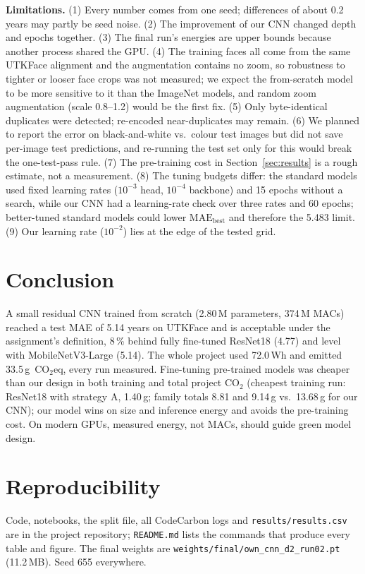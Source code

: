 \documentclass[conference,a4paper]{IEEEtran}
\newcommand{\cotwo}{CO$_2$}
\newcommand{\cotwoeq}{CO$_2$eq}
\begin{document}
\textbf{Limitations.} (1) Every number comes from one seed; differences of about 0.2 years may partly be seed noise. (2) The improvement of our CNN changed depth and epochs together. (3) The final run's energies are upper bounds because another process shared the GPU. (4) The training faces all come from the same UTKFace alignment and the augmentation contains no zoom, so robustness to tighter or looser face crops was not measured; we expect the from-scratch model to be more sensitive to it than the ImageNet models, and random zoom augmentation (scale 0.8--1.2) would be the first fix. (5) Only byte-identical duplicates were detected; re-encoded near-duplicates may remain. (6) We planned to report the error on black-and-white vs.\ colour test images but did not save per-image test predictions, and re-running the test set only for this would break the one-test-pass rule. (7) The pre-training cost in Section~\ref{sec:results} is a rough estimate, not a measurement. (8) The tuning budgets differ: the standard models used fixed learning rates ($10^{-3}$ head, $10^{-4}$ backbone) and 15 epochs without a search, while our CNN had a learning-rate check over three rates and 60 epochs; better-tuned standard models could lower $\mathrm{MAE}_{\text{best}}$ and therefore the 5.483 limit. (9) Our learning rate ($10^{-2}$) lies at the edge of the tested grid.

\section{Conclusion}
A small residual CNN trained from scratch (2.80\,M parameters, 374\,M MACs) reached a test MAE of 5.14 years on UTKFace and is acceptable under the assignment's definition, 8\,\% behind fully fine-tuned ResNet18 (4.77) and level with MobileNetV3-Large (5.14). The whole project used 72.0\,Wh and emitted 33.5\,g~\cotwoeq, every run measured. Fine-tuning pre-trained models was cheaper than our design in both training and total project \cotwo{} (cheapest training run: ResNet18 with strategy A, 1.40\,g; family totals 8.81 and 9.14\,g vs.\ 13.68\,g for our CNN); our model wins on size and inference energy and avoids the pre-training cost. On modern GPUs, measured energy, not MACs, should guide green model design.

\section*{Reproducibility}
Code, notebooks, the split file, all CodeCarbon logs and \texttt{results/results.csv} are in the project repository; \texttt{README.md} lists the commands that produce every table and figure. The final weights are \texttt{weights/final/own\_cnn\_d2\_run02.pt} (11.2\,MB). Seed 655 everywhere.
\end{document}
